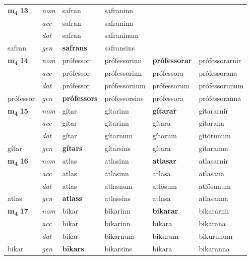 \begin{longtable}[l]{X>{\footnotesize\itshape}XXXXX}
\multirow{3}{*}{{{\textbf{m{\textsubscript{4}}} \Large{\textbf{13}}}}} & nom & safran & safraninn & \textbf{} &  \\*
 & acc & safran & safraninn &  &  \\*
 & dat & safran & safraninum &  &  \\*
 {\footnotesize{safran}} & gen & \textbf{safrans} & safransins &  &  \\
\midrule

\multirow{3}{*}{{{\textbf{m{\textsubscript{4}}} \Large{\textbf{14}}}}} & nom & prófessor & prófessorinn & \textbf{prófessorar} & prófessorarnir \\*
 & acc & prófessor & prófessorinn & prófessora & prófessorana \\*
 & dat & prófessor & prófessornum & prófessorum & prófessorunum \\*
 {\footnotesize{prófessor}} & gen & \textbf{prófessors} & prófessorsins & prófessora & prófessoranna \\
\midrule

\multirow{3}{*}{{{\textbf{m{\textsubscript{4}}} \Large{\textbf{15}}}}} & nom & gítar & gítarinn & \textbf{gítarar} & gítararnir \\*
 & acc & gítar & gítarinn & gítara & gítarana \\*
 & dat & gítar & gítarnum & gítörum & gítörunum \\*
 {\footnotesize{gítar}} & gen & \textbf{gítars} & gítarsins & gítara & gítaranna \\
\midrule

\multirow{3}{*}{{{\textbf{m{\textsubscript{4}}} \Large{\textbf{16}}}}} & nom & atlas & atlasinn & \textbf{atlasar} & atlasarnir \\*
 & acc & atlas & atlasinn & atlasa & atlasana \\*
 & dat & atlas & atlasnum & atlösum & atlösunum \\*
 {\footnotesize{atlas}} & gen & \textbf{atlass} & atlassins & atlasa & atlasanna \\
\midrule

\multirow{3}{*}{{{\textbf{m{\textsubscript{4}}} \Large{\textbf{17}}}}} & nom & bikar & bikarinn & \textbf{bikarar} & bikararnir \\*
 & acc & bikar & bikarinn & bikara & bikarana \\*
 & dat & bikar & bikarnum & bikurum & bikurunum \\*
 {\footnotesize{bikar}} & gen & \textbf{bikars} & bikarsins & bikara & bikaranna \\
\midrule


\end{longtable}
